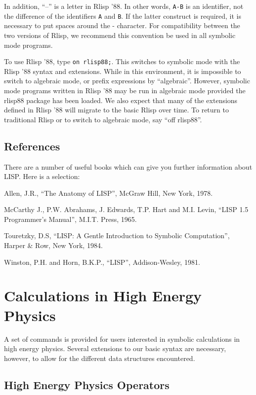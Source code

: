 In addition, ``--'' is a letter in Rlisp '88.  In other words, {\tt A-B} is an
identifier, not the difference of the identifiers {\tt A} and {\tt B}.  If
the latter construct is required, it is necessary to put spaces around the
- character.  For compatibility between the two versions of Rlisp, we
recommend this convention be used in all symbolic mode programs.

To use Rlisp '88, type {\tt on rlisp88;}.  This switches to
symbolic mode with the Rlisp '88 syntax and extensions.  While in this
environment, it is impossible to switch to algebraic mode, or prefix
expressions by ``algebraic''.  However, symbolic mode programs written in
Rlisp '88 may be run in algebraic mode provided the rlisp88 package has been
loaded.  We also expect that many of the extensions defined in Rlisp '88
will migrate to the basic Rlisp over time.  To return to traditional Rlisp
or to switch to algebraic mode, say ``off rlisp88''.

\section{References}

There are a number of useful books which can give you further information
about LISP. Here is a selection:

 Allen, J.R., ``The Anatomy of LISP'', McGraw Hill, New York, 1978.

 McCarthy J., P.W. Abrahams, J. Edwards, T.P. Hart and
     M.I. Levin, ``LISP 1.5 Programmer's Manual'', M.I.T. Press, 1965.

 Touretzky, D.S, ``{LISP}: A Gentle Introduction to Symbolic Computation'',
 Harper \& Row, New York, 1984.

 Winston, P.H. and Horn, B.K.P., ``LISP'', Addison-Wesley, 1981.

\chapter{Calculations in High Energy Physics}

A set of {\REDUCE} commands is provided for users interested in symbolic
calculations in high energy physics. Several extensions to our basic
syntax are necessary, however, to allow for the different data structures
encountered.

\section{High Energy Physics Operators}


